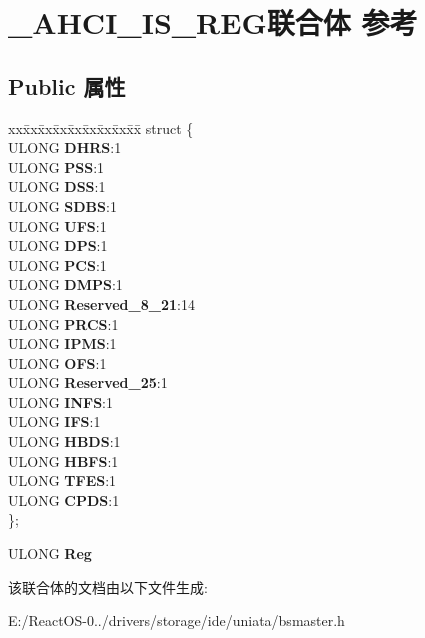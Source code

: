 \hypertarget{union___a_h_c_i___i_s___r_e_g}{}\section{\+\_\+\+A\+H\+C\+I\+\_\+\+I\+S\+\_\+\+R\+E\+G联合体 参考}
\label{union___a_h_c_i___i_s___r_e_g}
\subsection*{Public 属性}
\begin{DoxyCompactItemize}
\item 
\mbox{\label{union___a_h_c_i___i_s___r_e_g_a4515ae382bb25334dc606684df76253a}} 
\begin{tabbing}
xx\=xx\=xx\=xx\=xx\=xx\=xx\=xx\=xx\=\kill
struct \{\\
\>ULONG {\bfseries DHRS}:1\\
\>ULONG {\bfseries PSS}:1\\
\>ULONG {\bfseries DSS}:1\\
\>ULONG {\bfseries SDBS}:1\\
\>ULONG {\bfseries UFS}:1\\
\>ULONG {\bfseries DPS}:1\\
\>ULONG {\bfseries PCS}:1\\
\>ULONG {\bfseries DMPS}:1\\
\>ULONG {\bfseries Reserved\_8\_21}:14\\
\>ULONG {\bfseries PRCS}:1\\
\>ULONG {\bfseries IPMS}:1\\
\>ULONG {\bfseries OFS}:1\\
\>ULONG {\bfseries Reserved\_25}:1\\
\>ULONG {\bfseries INFS}:1\\
\>ULONG {\bfseries IFS}:1\\
\>ULONG {\bfseries HBDS}:1\\
\>ULONG {\bfseries HBFS}:1\\
\>ULONG {\bfseries TFES}:1\\
\>ULONG {\bfseries CPDS}:1\\
\}; \\

\end{tabbing}\item 
\mbox{\label{union___a_h_c_i___i_s___r_e_g_a42904a96f40b983591e0b6bf857a4d09}} 
U\+L\+O\+NG {\bfseries Reg}
\end{DoxyCompactItemize}


该联合体的文档由以下文件生成\+:\begin{DoxyCompactItemize}
\item 
E\+:/\+React\+O\+S-\/0../drivers/storage/ide/uniata/bsmaster.\+h\end{DoxyCompactItemize}
